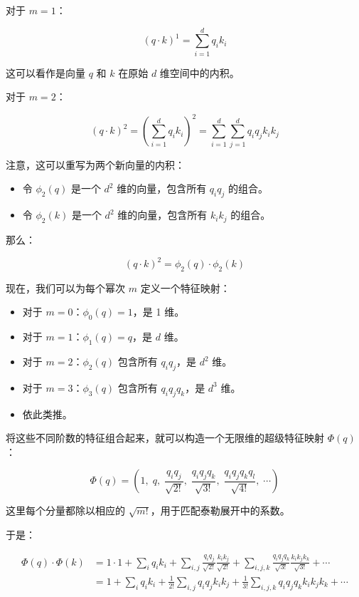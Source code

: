 对于 \(m=1\)：

\[
(q\cdot k)^1 = \sum_{i=1}^{d}q_i k_i
\]

这可以看作是向量 \(q\) 和 \(k\) 在原始 \(d\) 维空间中的内积。

对于 \(m=2\)：

\[
(q\cdot k)^2
= \left(\sum_{i=1}^{d}q_i k_i\right)^2
= \sum_{i=1}^{d}\sum_{j=1}^{d}q_i q_j k_i k_j
\]

注意，这可以重写为两个新向量的内积：

\begin{itemize}
\tightlist
\item
  令 \(\phi_2(q)\) 是一个 \(d^2\) 维的向量，包含所有 \(q_i q_j\) 的组合。
\item
  令 \(\phi_2(k)\) 是一个 \(d^2\) 维的向量，包含所有 \(k_i k_j\) 的组合。
\end{itemize}

那么：

\[
(q\cdot k)^2 = \phi_2(q)\cdot\phi_2(k)
\]

现在，我们可以为每个幂次 \(m\) 定义一个特征映射：

\begin{itemize}
\tightlist
\item
  对于 \(m=0\)：\(\phi_0(q)=1\)，是 1 维。
\item
  对于 \(m=1\)：\(\phi_1(q)=q\)，是 \(d\) 维。
\item
  对于 \(m=2\)：\(\phi_2(q)\) 包含所有 \(q_i q_j\)，是 \(d^2\) 维。
\item
  对于 \(m=3\)：\(\phi_3(q)\) 包含所有 \(q_i q_j q_k\)，是 \(d^3\) 维。
\item
  依此类推。
\end{itemize}

将这些不同阶数的特征组合起来，就可以构造一个无限维的超级特征映射 \(\Phi(q)\)：

\[
\Phi(q)=
\left(
1,\;
q,\;
\frac{q_i q_j}{\sqrt{2!}},\;
\frac{q_i q_j q_k}{\sqrt{3!}},\;
\frac{q_i q_j q_k q_l}{\sqrt{4!}},\;
\cdots
\right)
\]

这里每个分量都除以相应的 \(\sqrt{m!}\)，用于匹配泰勒展开中的系数。

于是：

\[
\begin{aligned}
\Phi(q)\cdot\Phi(k)
&= 1\cdot 1
+ \sum_i q_i k_i
+ \sum_{i,j}\frac{q_i q_j}{\sqrt{2!}}\frac{k_i k_j}{\sqrt{2!}}
+ \sum_{i,j,k}\frac{q_i q_j q_k}{\sqrt{3!}}\frac{k_i k_j k_k}{\sqrt{3!}}
+ \cdots \\
&= 1 + \sum_i q_i k_i
+ \frac{1}{2!}\sum_{i,j}q_i q_j k_i k_j
+ \frac{1}{3!}\sum_{i,j,k}q_i q_j q_k k_i k_j k_k
+ \cdots
\end{aligned}
\]

